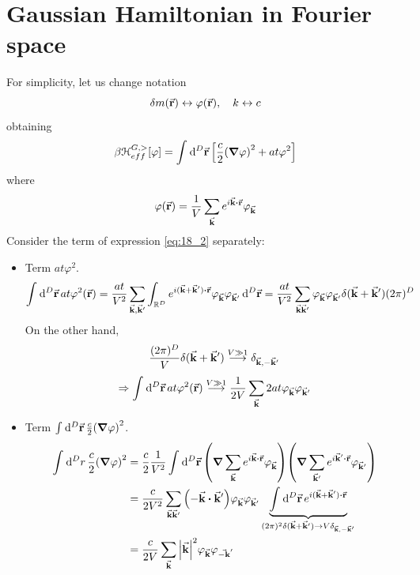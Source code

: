 \documentclass[../main/main.tex]{subfiles}
\begin{document}
\section{Gaussian Hamiltonian in Fourier space}
For simplicity, let us change notation
\begin{equation}
  \delta m (\va{r}) \leftrightarrow \varphi (\va{r}), \quad k \leftrightarrow c
\end{equation}
obtaining
\begin{equation}
  \beta \mathcal{H}_{eff}^{G,>} [\varphi ]= \int_{}^{} \dd[D]{\va{r}} \qty[\frac{c}{2} \qty(\grad \varphi )^2 + a t \varphi  ^2 ]
  \label{eq:18_2}
\end{equation}
where
\begin{equation}
  \varphi (\va{r}) = \frac{1}{V} \sum_{\va{k}}^{} e^{i \va{k} \vdot \va{r}} \varphi _{\va{k}}
\end{equation}
Consider the term of expression \eqref{eq:18_2} separately:
\begin{itemize}
\item Term \( a t \varphi ^2 \).
\begin{equation}
  \int_{}^{} \dd[D]{\va{r}} a t \varphi ^2 (\va{r}) = \frac{a t}{V^2} \sum_{\va{k},\va{k}'}^{}  \int_{\R^D}^{} e^{i (\va{k}+\va{k}') \vdot \va{r}} \varphi _{\va{k}} \varphi _{\va{k}'} \dd[D]{\va{r}}
  = \frac{at}{V^2} \sum_{\va{k}\va{k}'}^{} \varphi _{\va{k}} \varphi _{\va{k}'} \delta (\va{k}+\va{k}') (2 \pi )^D
\end{equation}
On the other hand,
\begin{equation}
  \frac{(2 \pi )^D}{V} \delta (\va{k}+ \va{k}') \overset{V \gg 1}{\longrightarrow} \delta _{\va{k},-\va{k}'}
\end{equation}
\begin{equation}
  \Rightarrow \int_{}^{} \dd[D]{\va{r}} a t \varphi ^2 (\va{r})  \overset{V \gg 1}{\longrightarrow} \frac{1}{2V} \sum_{\va{k}}^{} 2 a t  \varphi _{\va{k}} \varphi _{\va{k}'}
\end{equation}
\item Term \( \int_{}^{} \dd[D]{\va{r}} \frac{c}{2} \qty(\grad \varphi )^2    \).
\begin{equation}
\begin{split}
  \int_{}^{} \dd[D]{r} \frac{c}{2} \qty(\grad \varphi )^2 & = \frac{c}{2} \frac{1}{V^2} \int_{}^{} \dd[D]{\va{r}} \qty(\grad \sum_{\va{k}}^{} e^{i \va{k} \vdot \va{r}} \varphi _{\va{k}}  ) \qty(\grad \sum_{\va{k}'}^{} e^{i \va{k}' \vdot \va{r} } \varphi _{\va{k}'}  )     \\
  & = \frac{c}{2 V^2} \sum_{\va{k} \va{k}'}^{}  \qty(- \va{k} \vdot \va{k}') \varphi _{\va{k}} \varphi _{\va{k}'} \underbrace{\int_{}^{} \dd[D]{\va{r}}  e^{i (\va{k}+\va{k}')\vdot \va{r}}}_{(2 \pi )^2 \delta (\va{k}+ \va{k}') \rightarrow V \delta _{\va{k},-\va{k}'}}   \\
  & = \frac{c}{2V} \sum_{\va{k}}^{} \abs{\va{k}}^2 \varphi _{\va{k}} \varphi _{\va{-k}'}
\end{split}
\end{equation}
\end{itemize}
\end{document}
